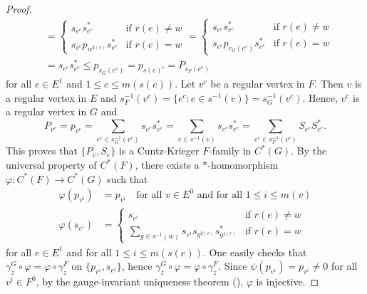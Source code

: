 \documentclass[12pt]{amsbook}%
\renewcommand{\phi}{\varphi}
\theoremstyle{defin}
\theoremstyle{remark}
\numberwithin{equation}{chapter}
\numberwithin{theor}{section}
\begin{document}
\begin{proof}
\begin{align*}
&= 
\begin{cases}
s_{e^c} s_{e^c}^* &\text{if } r(e) \neq w \\
s_{e^c} p_{ w^{k(e)} } s_{e^c}^* &\text{if } r(e)=w
\end{cases} = \begin{cases}
s_{e^c} s_{e^c}^* &\text{if } r(e) \neq w \\
s_{e^c} p_{ r_G(e^c)  } s_{e^c}^* &\text{if } r(e)=w
\end{cases} \\
&= s_{ e^c } s_{e^c}^* \leq p_{ s_G ( e^c) } = p_{ s(e)^c } = P_{ s_F( e^c) }
\end{align*}
for all $e \in E^1$ and $1 \leq c \leq m ( s(e) )$.  Let $v^c$ be a regular vertex in $F$.  Then $v$ is a regular vertex in $E$ and  $s^{-1}_{F}(v^c)=\{e^c \colon e\in s^{-1}(v)\} = s_G^{-1} ( v^c)$.  Hence, $v^c$ is a regular vertex in $G$ and 
\[
P_{v^c} = p_{v^c} =  \sum_{ e^c \in s_{G}^{-1} (v^c) } s_{e^c} s_{e^c}^*= \sum_{ e \in s^{-1} (v) } s_{e^c} s_{e^c}^*= \sum_{ e^c \in s_{F}^{-1} (v^c) } S_{e^c} S_{e^c}^*.
\]
This proves that $\{ P_v, S_e\}$ is a Cuntz-Krieger $F$-family in $C^*(G)$.  By the universal property of $C^*(F)$, there exists a $*$-homomorphism $\phi \colon C^*(F) \to C^*(G)$ such that  
\begin{align*}
\phi ( p_{v^{i}} ) &= p_{v^i} \quad \text{for all $v \in E^0$ and for all $1 \leq i \leq m(v)$}\\
\phi ( s_{e^{i}}) &= 
\begin{cases}
s_{e^i} &\text{if } r(e) \neq w \\
\displaystyle \sum_{ g \in s^{-1} (w) } s_{e^i} s_{g^{k(e)}} s_{ g^{j(e)}}^* &\text{if } r(e)=w
\end{cases}
\end{align*}
for all $e \in E^1$ and for all $1 \leq i \leq m ( s (e) )$.  One easily checks that  $\gamma_z^{G} \circ \phi = \phi \circ \gamma_z^F$ on $\{ p_{v^i}, s_{e^i} \}$, hence $\gamma_z^{G} \circ \phi = \phi \circ \gamma_z^F$.  Since $\psi( p_{v^i} ) = p_{v^i} \neq 0$ for all $v^i \in F^0$, by the gauge-invariant uniqueness theorem (\cite{bhrs:iccig}), $\phi$ is injective.  


\end{proof}
\end{document}
